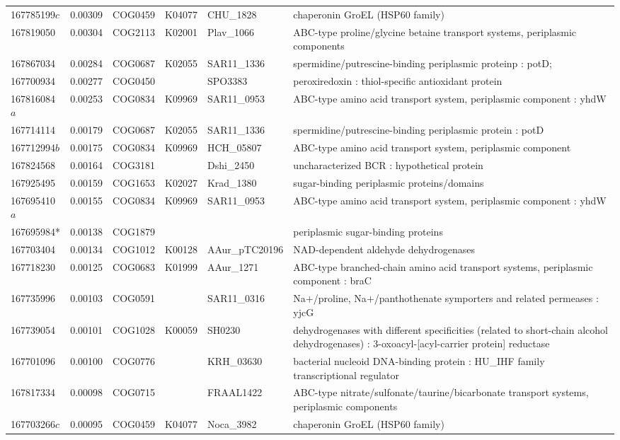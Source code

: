 \begin{landscape}
\begin{longtable}{p{1.6cm}p{1.2cm}p{1.5cm}p{1.5cm}p{2.8cm}p{13.5cm}}
167785199$c$&0.00309&COG0459&K04077&CHU\_1828&chaperonin GroEL (HSP60 family) \\
167819050&0.00304&COG2113&K02001&Plav\_1066&ABC-type proline/glycine betaine transport systems, periplasmic components \\
167867034&0.00284&COG0687&K02055&SAR11\_1336&spermidine/putrescine-binding periplasmic proteinp : potD; \\
167700934&0.00277&COG0450&&SPO3383&peroxiredoxin : thiol-specific antioxidant protein \\
167816084$a$&0.00253&COG0834&K09969&SAR11\_0953&ABC-type amino acid transport system, periplasmic component : yhdW \\
167714114&0.00179&COG0687&K02055&SAR11\_1336&spermidine/putrescine-binding periplasmic protein : potD \\
167712994$b$&0.00175&COG0834&K09969&HCH\_05807&ABC-type amino acid transport system, periplasmic component \\
167824568&0.00164&COG3181&&Dshi\_2450&uncharacterized BCR : hypothetical protein \\
167925495&0.00159&COG1653&K02027&Krad\_1380&sugar-binding periplasmic proteins/domains \\
167695410$a$&0.00155&COG0834&K09969&SAR11\_0953&ABC-type amino acid transport system, periplasmic component : yhdW \\
167695984*&0.00138&COG1879&&&periplasmic sugar-binding proteins \\
167703404&0.00134&COG1012&K00128&AAur\_pTC20196&NAD-dependent aldehyde dehydrogenases \\
167718230&0.00125&COG0683&K01999&AAur\_1271&ABC-type branched-chain amino acid transport systems, periplasmic component : braC \\
167735996&0.00103&COG0591&&SAR11\_0316&Na$+$/proline, Na$+$/panthothenate symporters and related permeases : yjcG \\
167739054&0.00101&COG1028&K00059&SH0230&dehydrogenases with different specificities (related to short-chain alcohol dehydrogenases) : 3-oxoacyl-[acyl-carrier protein] reductase \\
167701096&0.00100&COG0776&&KRH\_03630&bacterial nucleoid DNA-binding protein : HU\_IHF family transcriptional regulator \\
167817334&0.00098&COG0715&&FRAAL1422&ABC-type nitrate/sulfonate/taurine/bicarbonate transport systems, periplasmic components \\
167703266$c$&0.00095&COG0459&K04077&Noca\_3982&chaperonin GroEL (HSP60 family) \\

\end{longtable}
\end{landscape}
